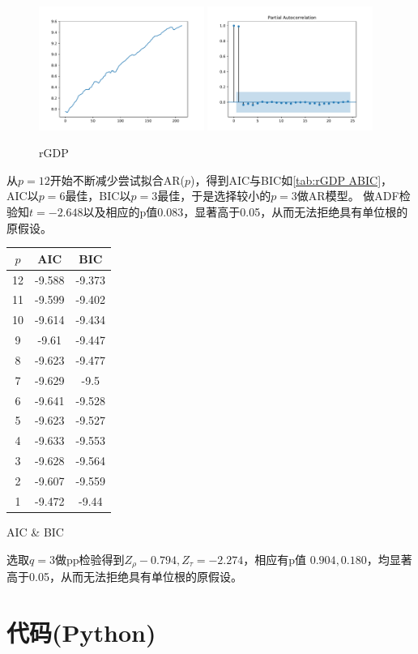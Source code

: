 \documentclass[cn]{homework}
\begin{document}
    \begin{figure}[h]
        \centering
        \includegraphics[width=0.48\textwidth]{rGDP-trend}
        \includegraphics[width=0.48\textwidth]{rGDP-pacf}
        \caption{rGDP}
        \label{fig:rGDP}
    \end{figure}

    从$p=12$开始不断减少尝试拟合AR($p$)，得到AIC与BIC如\cref{tab:rGDP ABIC}，
    AIC以$p=6$最佳，BIC以$p=3$最佳，于是选择较小的$p=3$做AR模型。
    做ADF检验知$t=-2.648$以及相应的p值$0.083$，显著高于0.05，从而无法拒绝具有单位根的原假设。

    \begin{margintable}
        \centering
        \begin{tabular}{ccc}
            \toprule
            $p$ & AIC & BIC \\
            \midrule
            12 & -9.588 & -9.373 \\
            11 & -9.599 & -9.402 \\
            10 & -9.614 & -9.434 \\
            9 & -9.61 & -9.447 \\
            8 & -9.623 & -9.477 \\
            7 & -9.629 & -9.5 \\
            6 & -9.641 & -9.528 \\
            5 & -9.623 & -9.527 \\
            4 & -9.633 & -9.553 \\
            3 & -9.628 & -9.564 \\
            2 & -9.607 & -9.559 \\
            1 & -9.472 & -9.44 \\
            \bottomrule
        \end{tabular}        
        \caption{AIC \& BIC}
        \label{tab:rGDP ABIC}
    \end{margintable}

    选取$q=3$做pp检验得到$Z_\rho-0.794,Z_\tau=-2.274$，相应有p值
    $0.904,0.180$，均显著高于0.05，从而无法拒绝具有单位根的原假设。

    \newpage
    \appendix
    \section{代码(Python)}
    
\end{document}
